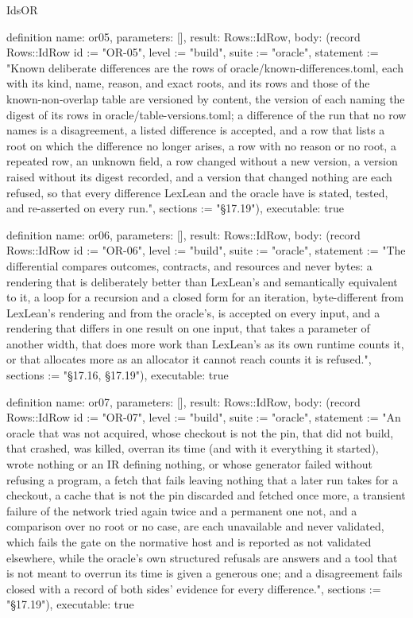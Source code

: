\begin{lexlean}{IdsOR}
\begin{semanticmodule}
definition{
  name: or05,
  parameters: [],
  result: Rows::IdRow,
  body: (record Rows::IdRow {id := "OR-05", level := "build", suite := "oracle", statement := "Known deliberate differences are the rows of oracle/known-differences.toml, each with its kind, name, reason, and exact roots, and its rows and those of the known-non-overlap table are versioned by content, the version of each naming the digest of its rows in oracle/table-versions.toml; a difference of the run that no row names is a disagreement, a listed difference is accepted, and a row that lists a root on which the difference no longer arises, a row with no reason or no root, a repeated row, an unknown field, a row changed without a new version, a version raised without its digest recorded, and a version that changed nothing are each refused, so that every difference LexLean and the oracle have is stated, tested, and re-asserted on every run.", sections := "§17.19"}),
  executable: true
}

definition{
  name: or06,
  parameters: [],
  result: Rows::IdRow,
  body: (record Rows::IdRow {id := "OR-06", level := "build", suite := "oracle", statement := "The differential compares outcomes, contracts, and resources and never bytes: a rendering that is deliberately better than LexLean's and semantically equivalent to it, a loop for a recursion and a closed form for an iteration, byte-different from LexLean's rendering and from the oracle's, is accepted on every input, and a rendering that differs in one result on one input, that takes a parameter of another width, that does more work than LexLean's as its own runtime counts it, or that allocates more as an allocator it cannot reach counts it is refused.", sections := "§17.16, §17.19"}),
  executable: true
}

definition{
  name: or07,
  parameters: [],
  result: Rows::IdRow,
  body: (record Rows::IdRow {id := "OR-07", level := "build", suite := "oracle", statement := "An oracle that was not acquired, whose checkout is not the pin, that did not build, that crashed, was killed, overran its time (and with it everything it started), wrote nothing or an IR defining nothing, or whose generator failed without refusing a program, a fetch that fails leaving nothing that a later run takes for a checkout, a cache that is not the pin discarded and fetched once more, a transient failure of the network tried again twice and a permanent one not, and a comparison over no root or no case, are each unavailable and never validated, which fails the gate on the normative host and is reported as not validated elsewhere, while the oracle's own structured refusals are answers and a tool that is not meant to overrun its time is given a generous one; and a disagreement fails closed with a record of both sides' evidence for every difference.", sections := "§17.19"}),
  executable: true
}


\end{semanticmodule}
\end{lexlean}
